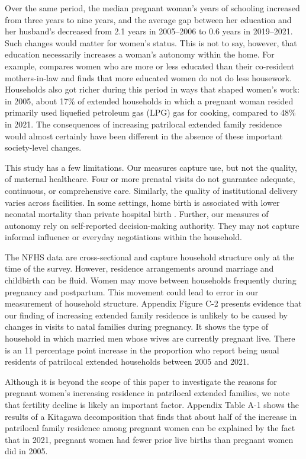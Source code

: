 \documentclass[10pt,twoside,reqno]{article}
\begin{document}
Over the same period, the median pregnant woman's years of schooling increased from three years to nine years, and the average gap between her education and her husband's decreased from 2.1 years in 2005--2006 to 0.6 years in 2019--2021.  Such changes would matter for women's status.  This is not to say, however, that education necessarily increases a woman's autonomy within the home.  For example, \cite{srivastava2020time} compares women who are more or less educated than their co-resident mothers-in-law and finds that more educated women do not do less housework.  Households also got richer during this period in ways that shaped women's work: in 2005, about 17\% of extended households in which a pregnant woman resided primarily used liquefied petroleum gas (LPG) gas  for cooking, compared to 48\% in 2021.  The consequences of increasing patrilocal extended family residence would almost certainly have been different in the absence of these important society-level changes.

This study has a few limitations. Our measures capture use, but not the quality, of maternal healthcare. Four or more prenatal visits do not guarantee adequate, continuous, or comprehensive care. Similarly, the quality of institutional delivery varies across facilities.  In some settings, home birth is associated with lower neonatal mortality than private hospital birth \citep{coffey2025excess}. Further, our measures of autonomy rely on self-reported decision-making authority. They may not capture informal influence or everyday negotiations within the household. 

The NFHS data are cross-sectional and capture household structure only at the time of the survey. However, residence arrangements around marriage and childbirth can be fluid. Women may move between households frequently during pregnancy and postpartum. This movement could lead to error in our measurement of household structure.  Appendix Figure C-2 presents evidence that our finding of increasing extended family residence is unlikely to be caused by changes in visits to natal families during pregnancy.  It shows the type of household in which married men whose wives are currently pregnant live.  There is an 11 percentage point increase in the proportion who report being usual residents of patrilocal extended households between 2005 and 2021.

Although it is beyond the scope of this paper to investigate the reasons for pregnant women's increasing residence in patrilocal extended families, we note that fertility decline is likely an important factor.  Appendix Table A-1 shows the results of a Kitagawa decomposition that finds that about half of the increase in patrilocal family residence among pregnant women can be explained by the fact that in 2021, pregnant women had fewer prior live births than pregnant women did in 2005.  
\end{document}
